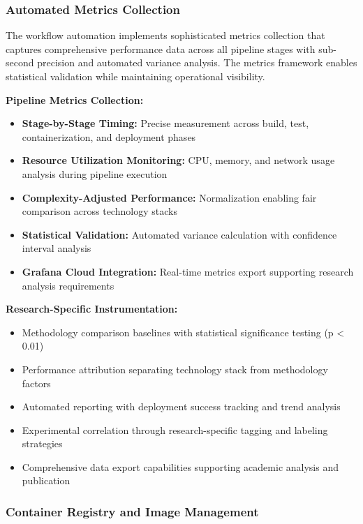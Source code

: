 \subsubsection{Automated Metrics Collection}

The workflow automation implements sophisticated metrics collection that captures comprehensive performance data across all pipeline stages with sub-second precision and automated variance analysis. The metrics framework enables statistical validation while maintaining operational visibility.

\textbf{Pipeline Metrics Collection:}
\begin{itemize}
\item \textbf{Stage-by-Stage Timing:} Precise measurement across build, test, containerization, and deployment phases
\item \textbf{Resource Utilization Monitoring:} CPU, memory, and network usage analysis during pipeline execution
\item \textbf{Complexity-Adjusted Performance:} Normalization enabling fair comparison across technology stacks
\item \textbf{Statistical Validation:} Automated variance calculation with confidence interval analysis
\item \textbf{Grafana Cloud Integration:} Real-time metrics export supporting research analysis requirements
\end{itemize}

\textbf{Research-Specific Instrumentation:}
\begin{itemize}
\item Methodology comparison baselines with statistical significance testing (p < 0.01)
\item Performance attribution separating technology stack from methodology factors
\item Automated reporting with deployment success tracking and trend analysis
\item Experimental correlation through research-specific tagging and labeling strategies
\item Comprehensive data export capabilities supporting academic analysis and publication
\end{itemize}

\subsubsection{Container Registry and Image Management}

